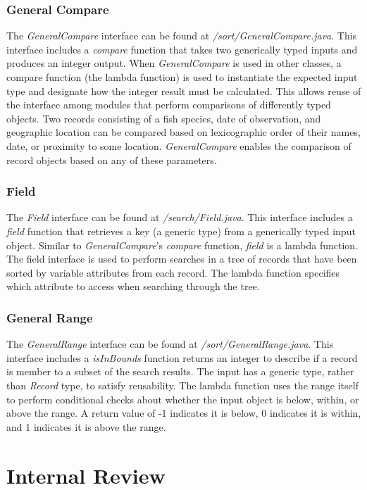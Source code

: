 \documentclass{article}
\begin{document}
\subsubsection{General Compare}
The \textit{GeneralCompare} interface can be found at \textit{/sort/GeneralCompare.java}. This interface includes a \textit{compare} function that takes two generically typed inputs and produces an integer output. When \textit{GeneralCompare} is used in other classes, a compare function (the lambda function) is used to instantiate the expected input type and designate how the integer result must be calculated. This allows reuse of the interface among modules that perform comparisons of differently typed objects. Two records consisting of a fish species, date of observation, and geographic location can be compared based on lexicographic order of their names, date, or proximity to some location. \textit{GeneralCompare} enables the comparison of record objects based on any of these parameters. 

\subsubsection{Field}
The \textit{Field} interface can be found at \textit{/search/Field.java}. This interface includes a \textit{field} function that retrieves a key (a generic type) from a generically typed input object. Similar to \textit{GeneralCompare}'s \textit{compare} function, \textit{field} is a lambda function. The field interface is used to perform searches in a tree of records that have been sorted by variable attributes from each record. The lambda function specifies which attribute to access when searching through the tree.

\subsubsection{General Range}
The \textit{GeneralRange} interface can be found at \textit{/sort/GeneralRange.java}. This interface includes a \textit{isInBounds} function returns an integer to describe if a record is member to a subset of the search results. The input has a generic type, rather than \textit{Record} type, to satisfy reusability. The lambda function uses the range itself to perform conditional checks about whether the input object is below, within, or above the range. A return value of -1 indicates it is below, 0 indicates it is within, and 1 indicates it is above the range.

\section{Internal Review}
\end{document}

